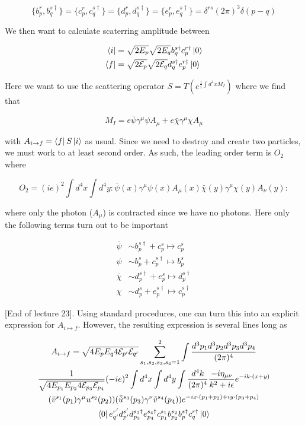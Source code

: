 \documentclass{article}
\theoremstyle{definition}
\begin{document}
$$ \{ b_p^r, b_q^{s\dagger}\} = \{c_p^r, c_q^{s \dagger}\} = \{d_p^r, d_q^{s
  \dagger}\} = \{e_p^r, e_q^{s \dagger}\} = \delta^{rs} (2\pi)^3 \delta(p - q) $$

We then want to calculate scaterring amplitude between

\begin{align*}
\bra{i} &= \sqrt{2 E_p} \sqrt{2 E_q} b_q^{s \dagger} c_p^{r \dagger} \ket{0} \\
\bra{f} &= \sqrt{2 \mathcal{E}_p} \sqrt{2 \mathcal{E}_q} d_q^{s \dagger} e_p^{r \dagger} \ket{0}
\end{align*}

Here we want to use the scattering operator $S = T \left( e^{\frac{1}{i} \int
    d^4x M_I} \right)$ where we find that

$$ M_I = e \bar{\psi} \gamma^\mu \psi A_\mu + e \bar{\chi} \gamma^\mu \chi
A_\mu $$

with $A_{i \to f} = \bra{f} S \ket{i}$ as usual. Since we need to destroy and
create two particles, we must work to at least second order. As such, the
leading order term is $O_2$ where

$$ O_2 = (i e)^2 \int d^4x \int d^4y : \bar{\psi}(x) \gamma^\mu \psi(x) A_\mu(x)
\bar{\chi}(y) \gamma^\mu \chi(y) A_\nu(y): $$

where only the photon ($A_\mu$) is contracted since we have no photons. Here
only the following terms turn out to be important

\begin{align*}
\bar{\psi} &\sim b_p^{s \dagger} + c_p^s \mapsto c_p^s \\
\psi &\sim b_p^s + c_p^{s \dagger} \mapsto b_p^s \\
\bar{\chi} &\sim d_p^{s \dagger} + e_p^s \mapsto d_p^{s \dagger} \\
\chi &\sim d_p^s + e_p^{s \dagger} \mapsto c_p^{s \dagger}
\end{align*}

[End of lecture 23]. Using standard procedures, one can turn this into an
explicit expression for $A_{i \mapsto f}$. However, the resulting expression is
several lines long as

\begin{multline*}
  A_{i \to f} = \sqrt{4E_p E_q 4 \mathcal{E}_{p'} \mathcal{E}_{q'}} \sum_{s_1,
    s_2, s_3, s_4 = 1}^2 \int \frac{d^3p_1 d^3p_2 d^3p_3 d^3p_4}{(2\pi)^4} \\
  \frac{1}{\sqrt{4 E_{p_1} E_{p_2} 4 \mathcal{E}_{p_3} \mathcal{E}_{p_4}}}
  (-ie)^2 \int d^4x \int d^4y \int \frac{d^4k}{(2\pi)^4} \frac{-i \eta_{\mu
      \nu}}{k^2 + i \epsilon} e^{-ik \cdot (x + y)} \\
(\bar{v}^{s_1}(p_1) \gamma^\mu u^{s_2}(p_2)) (\bar{\tilde{u}}^{s_3}(p_3)
\gamma^\nu \tilde{v}^{s_4}(p_4)) e^{-ix \cdot (p_1 + p_2) + iy \cdot (p_3 +
  p_4)} \\
\bra{0} e_{q'}^{r'} d_{p'}^{s'} d_{p_3}^{s_3 \dagger} e_{p_4}^{s_4 \dagger}
c_{p_1}^{s_1} b_{p_2}^{s_2} b_p^{s \dagger} c_q^{r \dagger} \ket{0}
\end{multline*}
\end{document}
